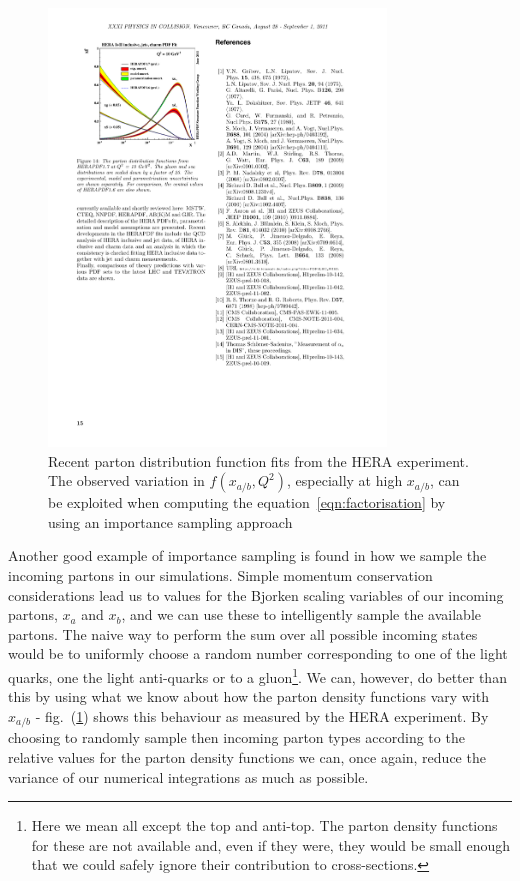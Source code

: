 	\begin{figure}[htp]
		\centering
		\includegraphics[width=0.8\textwidth, height=0.6\textwidth]{HERAFit}
		\caption{Recent parton distribution function fits from the HERA experiment.  The observed variation in $f(x_{a/b}, Q^2)$, especially at high
		         $x_{a/b}$, can be exploited when computing the equation~\ref{eqn:factorisation} by using an importance sampling approach}
		\label{fig:heraFit}
  	\end{figure}

  	Another good example of importance sampling is found in how we sample the incoming partons in our simulations.  Simple momentum
  	conservation considerations lead us to values for the Bjorken scaling variables of our incoming partons, $x_a$ and $x_b$, and we
  	can use these to intelligently sample the available partons.  The naive way to perform the sum over all possible incoming states
  	would be to uniformly choose a random number corresponding to one of the light quarks, one the light anti-quarks or to a
  	gluon\footnote{Here we mean all except the top and anti-top.  The parton density functions for these are not available
  	and, even if they were, they would be small enough that we could safely ignore their contribution to cross-sections.}.  We can,
  	however, do better than this by using what we know about how the parton density functions vary with $x_{a/b}$ - fig.~(\ref{fig:heraFit})
  	shows this behaviour as measured by the HERA experiment.  By choosing to randomly sample then incoming parton types according to the relative values
  	for the parton density functions we can, once again, reduce the variance of our numerical integrations as much as possible.

